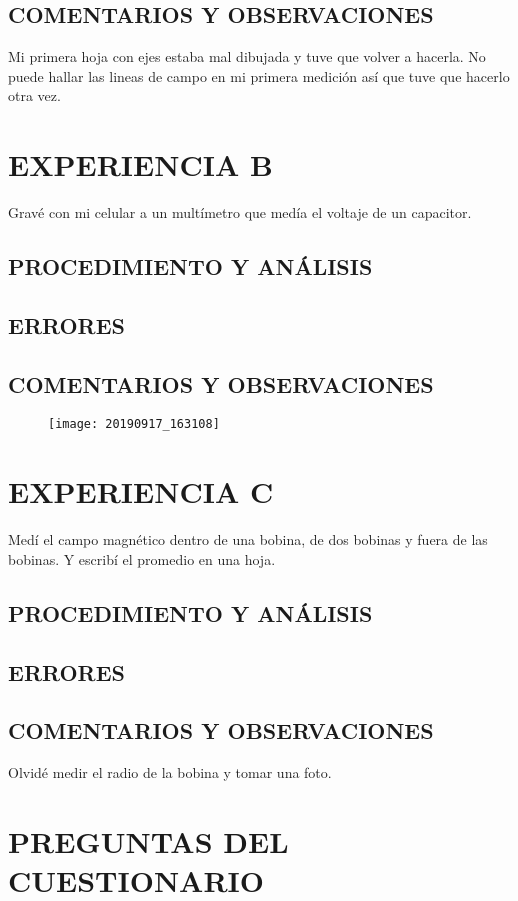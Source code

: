 \documentclass[10pt, twoside]{article}
\begin{document}
\subsection{COMENTARIOS Y OBSERVACIONES}%
Mi primera hoja con ejes estaba mal dibujada y tuve que volver a hacerla.
No puede hallar las lineas de campo en mi primera medición
así que tuve que hacerlo otra vez.

\section{EXPERIENCIA B}
Gravé con mi celular a un multímetro que medía el voltaje de un capacitor.

\subsection{PROCEDIMIENTO Y ANÁLISIS}%
\subsection{ERRORES}%
\subsection{COMENTARIOS Y OBSERVACIONES}%

\begin{figure}[H]
	\centering
	\texttt{[image: 20190917\_163108]}
\end{figure}

\section{EXPERIENCIA C}
Medí el campo magnético dentro de una bobina, de dos bobinas y fuera de las bobinas.
Y escribí el promedio en una hoja.

\subsection{PROCEDIMIENTO Y ANÁLISIS}%
\subsection{ERRORES}%
\subsection{COMENTARIOS Y OBSERVACIONES}%
Olvidé medir el radio de la bobina y tomar una foto.

\section{PREGUNTAS DEL CUESTIONARIO}
\end{document}
